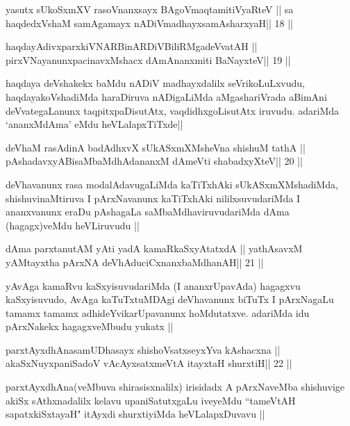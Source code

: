 \begin{shl}
yasutx sUkoSxmXV rasoV\s nanxsayx BAgoV\s maqtamitiVyaRteV ||
sa haqdedxVshaM samAgamayx nADiVmadhayxsamAsharxyaH\hfill || 18 ||
\end{shl}

\begin{shl}
haqdayAdivxparxkiVNARBinARDiVBiliRMgadeVvatAH ||
pirxVNayanunxpacinavxMshacx dAmAnanxmiti BaNayxteV\hfill || 19 ||
\end{shl}

\begin{artha}
haqdaya deVshakekx baMdu nADiV madhayxdalilx seVrikoLuLxvudu,
haqdayakoVshadiMda haraDiruva nADigaLiMda aMgashariVrada
aBimAni deVvategaLanunx taqpitxpaDisutAtx, vaqdidhxgoLisutAtx
iruvudu. adariMda `ananxMdAma' eMdu heVLalapxTiTxde||
\end{artha}

\begin{shl}
deVhaM rasAdinA badAdhxvX sUkASxmXMsheVna shishuM tathA ||
pAshadavxyABisaMbaMdhAdananxM dAmeVti shabadxyXteV\hfill || 20 ||
\end{shl}

\begin{artha}
deVhavanunx rasa modalAdavugaLiMda kaTiTxhAki sUkASxmXMshadiMda,
shishuvinaMtiruva I pArxNavanunx kaTiTxhAki nililxsuvudariMda I
ananxvanunx eraDu pAshagaLa saMbaMdhaviruvudariMda dAma (hagagx)veMdu
heVLiruvudu ||
\end{artha}

\begin{shl}
dAma parxtanutAM yAti yadA kamaRkaSxyAtatxdA ||
yathAsavxM yAMtayxtha pArxNA deVhAduciCxnanxbaMdhanAH\hfill || 21 ||
\end{shl}

\begin{artha}
yAvAga kamaRvu kaSxyisuvudariMda (I ananxrUpavAda) hagagxvu
kaSxyisuvudo, AvAga kaTuTxtuMDAgi deVhavanunx biTuTx I pArxNagaLu
tamamx tamamx adhideYvikarUpavanunx hoMdutatxve. adariMda idu
pArxNakekx hagagxveMbudu yukatx ||
\end{artha}

\begin{shl}
parxtAyxdhAnasamUDhasayx shishoVsatxseyxYva kAshacxna ||
akaSxNuyxpaniSadoV vAcAyxsatxmeVtA itayxtaH shurxtiH\hfill || 22 ||
\end{shl}

\begin{artha}
parxtAyxdhAna(veMbuva shirasisxnalilx) irisidadx A pArxNaveMba
shishuvige akiSx sAthxnadalilx kelavu upaniSatutxgaLu iveyeMdu
``tameVtAH sapatxkiSxtayaH" itAyxdi shurxtiyiMda heVLalapxDuvavu ||
\end{artha}

